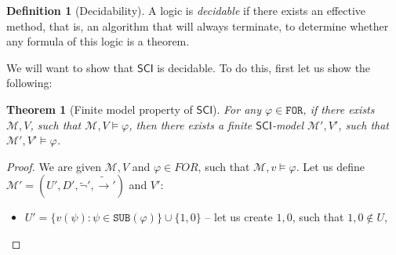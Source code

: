 \documentclass{article}
\newtheorem{theorem}{Theorem}
\theoremstyle{definition}
\newtheorem{definition}{Definition}[section]
\theoremstyle{definition}
\newcommand*{\ra}{\rightarrow}
\newcommand*{\FOR}{\texttt{FOR}}
\newcommand*{\SUB}{\texttt{SUB}}
\newcommand{\SCI}{$\mathsf{SCI}$\xspace}
\begin{document}
\begin{definition}[Decidability]
    A logic is \emph{decidable} if there exists an effective method, that is, an algorithm that will always terminate, to determine whether any formula of this logic is a theorem.
\end{definition}
%
We will want to show that \SCI is decidable. To do this, first let us show the
following:
\begin{theorem}[Finite model property of \SCI]
    \label{finite_model}
    For any $\varphi \in \FOR$, if there exists $\mathcal{M},V$, such that $\mathcal{M},V \models \varphi$, then there exists a finite \SCI-model $\mathcal{M'},V'$, such that $\mathcal{M'},V'\models \varphi$.
\end{theorem}
\begin{proof}
    We are given $\mathcal{M}, V$ and $\varphi \in FOR$, such that $\mathcal{M}, v \models \varphi$. Let us define $\mathcal{M'} = (U', D', \tilde{\lnot}', \tilde{\ra}')$ and $V'$:
    \begin{itemize}
        \item $U' = \{v(\psi) : \psi \in \SUB(\varphi)\} \cup \{1, 0\}$ -- let us create $1, 0$, such that $1, 0 \not \in U$,


\end{itemize}
\end{proof}
\end{document}
